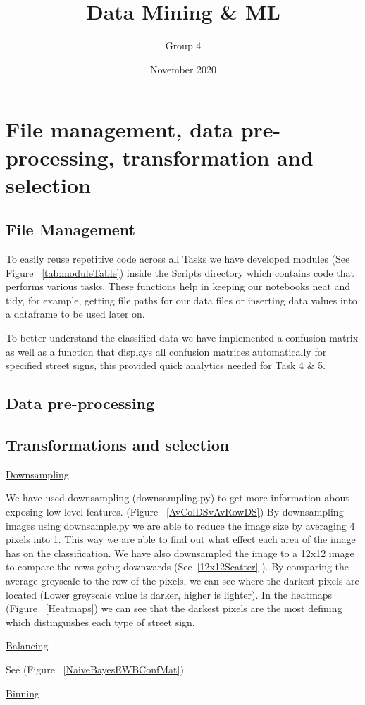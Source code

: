 \documentclass[11pt]{article}
\title{Data Mining \& ML}
\author{ Group 4 }
\date{November 2020}
\begin{document}
\maketitle

\pagebreak

\tableofcontents
\thispagestyle{empty}
\pagebreak
\setcounter{page}{1}

\pagebreak

\section{File management, data pre-processing, transformation and selection} 
\subsection{File Management}

To easily reuse repetitive code across all Tasks we have developed modules (See Figure ~\ref{tab:moduleTable}) inside 
the Scripts directory which contains code that performs various tasks. These functions help
in keeping our notebooks neat and tidy, for example, getting file paths for our data files or 
inserting data values into a dataframe to be used later on.
\par
To better understand the classified data we have implemented a confusion matrix as well as 
a function that displays all confusion matrices automatically for specified street signs, this 
provided quick analytics needed for Task 4 \& 5.

\subsection{Data pre-processing}


\subsection{Transformations and selection}\label{sec:transSel}

\underline{Downsampling}
\par
We have used downsampling (downsampling.py) to get more information about exposing low level features.
(Figure ~\ref{AvColDSvAvRowDS}) By downsampling images using downsample.py we are able to reduce the image size by averaging 4 pixels into 1. This way we are able to find out what effect each area of the image has on the classification.
We have also downsampled the image to a 12x12 image to compare the rows going downwards (See~\ref{12x12Scatter} ).
By comparing the average greyscale to the row of the pixels, we can see where the
darkest pixels are located (Lower greyscale value is darker, higher is lighter).
In the heatmaps (Figure ~\ref{Heatmaps}) we can see that the darkest pixels are the most defining which distinguishes 
each type of street sign.
\par
\underline{Balancing}
\par
See (Figure ~\ref{NaiveBayesEWBConfMat}) 
\par
\underline{Binning}
\par
\end{document}
